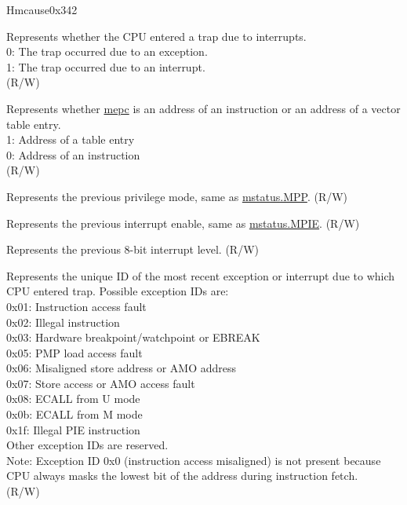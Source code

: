 \begin{register}{H}{mcause}{0x342}\label{regdesc:MCAUSE}
%
%
%
%
%
%
%
%
\regnewline%
\begin{regdesc}\begin{reglist}
\label{fielddesc:MCAUSEINT}\item [INT] Represents whether the CPU entered a trap due to interrupts. \\
0: The trap occurred due to an exception.\\
1: The trap occurred due to an interrupt.\\
(R/W)
\label{fielddesc:MCAUSE_MINHV}\item [MINHV] Represents whether \hyperref[fielddesc:MEPC]{mepc} is an address of an instruction or an address of a vector table entry.\\
1: Address of a table entry\\
0: Address of an instruction\\
(R/W)
\label{fielddesc:MCAUSE_MPP}\item [MPP] Represents the previous privilege mode, same as \hyperref[fielddesc:MSTATUSMPP]{mstatus.MPP}. (R/W)
\label{fielddesc:MCAUSE_MPIE}\item [MPIE] Represents the previous interrupt enable, same as \hyperref[fielddesc:MSTATUSMPIE]{mstatus.MPIE}. (R/W)
\label{fielddesc:MCAUSE_MPIL}\item [MPIL] Represents the previous 8-bit interrupt level. (R/W)
\label{fielddesc:MCAUSECODE}\item [CODE] Represents the unique ID of the most recent exception or interrupt due to which CPU entered trap. Possible exception IDs are:\\
0x01: Instruction access fault\\
0x02: Illegal instruction\\
0x03: Hardware breakpoint/watchpoint or EBREAK\\
0x05: PMP load access fault\\
0x06: Misaligned store address or AMO address\\
0x07: Store access or AMO access fault\\
0x08: ECALL from U mode\\
0x0b: ECALL from M mode\\
0x1f: Illegal PIE instruction\\
Other exception IDs are reserved.\\
Note: Exception ID 0x0 (instruction access misaligned) is not present because CPU always masks the lowest bit of the address during instruction fetch.\\
(R/W)
\end{reglist}\end{regdesc}
\end{register}

